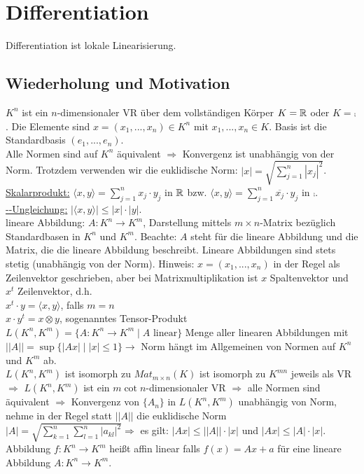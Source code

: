\setcounter{dummy}{16}
\addtocounter{section}{15}
\addtocounter{chapter}{4}

\chapter{Differentiation}
	Differentiation ist lokale Linearisierung.

\section{Wiederholung und Motivation}
	\begin{ueberblick}
	$K^n$ ist ein $n$-dimensionaler VR über dem vollständigen Körper $K=\mathbb{R}$ 
	oder $K=\comp$. Die Elemente sind $x=(x_1,...,x_n)\in K^n$ mit 
	$x_1,...,x_n\in K$. Basis ist die Standardbasis $(e_1,...,e_n)$. \\
	
	
	Alle Normen sind auf $K^n$ äquivalent $\Rightarrow$ Konvergenz ist 
	unabhängig von der Norm. Trotzdem verwenden wir die euklidische Norm: 
	$|x|=\sqrt{\sum\limits_{j=1}^n |x_j|^2}$. \\
	
	
	\underline{Skalarprodukt:} $\langle x,y \rangle=\sum\limits_{j=1}^n x_j\cdot y_j$ in 
	$\mathbb{R}$ bzw. $\langle x,y \rangle=\sum\limits_{j=1}^n \overline{x_j}
	\cdot y_j$ in $\comp$. \\
	
	
	\underline{--Ungleichung:} $|\langle x,y \rangle| \le
	|x|\cdot |y|$. \\

	
	lineare Abbildung: $A:K^n \to K^m$, Darstellung mittels $m\times n$-Matrix 
	bezüglich Standardbasen in $K^n$ und $K^m$. Beachte: $A$ steht für die 
	lineare Abbildung und die Matrix, die die lineare Abbildung beschreibt. 
	Lineare Abbildungen sind stets stetig (unabhängig von der Norm). Hinweis: 
	$x=(x_1,...,x_n)$ in der Regel als Zeilenvektor geschrieben, aber bei 
	Matrixmultiplikation ist $x$ Spaltenvektor und $x^t$ Zeilenvektor, d.h. \\
	$x^t\cdot y=\langle x,y \rangle$, falls $m=n$ \\
	$x\cdot y^t=x\otimes y$, sogenanntes Tensor-Produkt \\
	
	
	$L(K^n,K^m)=\{A: K^n \to K^m \mid A \text{ linear}\}$ Menge aller 
	linearen Abbildungen mit $||A||=\sup\{|Ax| \mid |x|\le 1\} \to$ Norm 
	hängt im Allgemeinen von Normen auf $K^n$ und $K^m$ ab. \\
	$L(K^n,K^m)$ ist isomorph zu $Mat_{m\times n}(K)$ ist isomorph zu $K^{mn}$ 
	jeweils als VR $\Rightarrow$ $L(K^n,K^m)$ ist ein $m\cot n$-dimensionaler 
	VR $\Rightarrow$ alle Normen sind äquivalent $\Rightarrow$ Konvergenz von 
	$\{A_n\}$ in $L(K^n,K^m)$ unabhängig von Norm, nehme in der Regel statt 
	$||A||$ die euklidische Norm $|A|=\sqrt{\sum\limits_{k=1}^n \sum\limits_
	{l=1}^n |a_{kl}|^2} \Rightarrow$ es gilt: $|Ax|\le ||A||\cdot |x|$ und 
	$|Ax|\le |A|\cdot |x|$. \\
	
	
	Abbildung $f:K^n\to K^m$ heißt affin linear falls $f(x)=Ax+a$ für eine 
	lineare Abbildung $A:K^n\to K^m$.
	\end{ueberblick}
